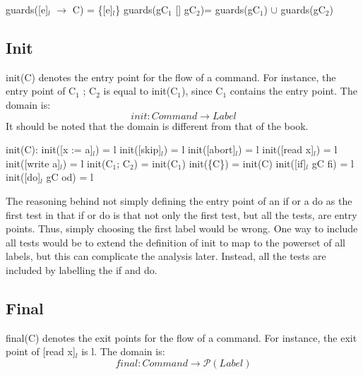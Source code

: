 guards([e]$_l$ $\to$ C)      = \{[e]$_l$\} \newline
guards(gC$_1$ [] gC$_2$)= guards(gC$_1$) $\cup$ guards(gC$_2$)\newline

\subsection{Init}

init(C) denotes the entry point for the flow of a command.
For instance, the entry point of C$_1$ ; C$_2$ is equal to init(C$_1$),
since C$_1$ contains the entry point. The domain is:
\[init \colon Command \to Label\]
It should be noted that the domain is different from that of the book.

init(C):\newline
init([x := a]$_l$)      = l\newline
init([skip]$_l$)        = l\newline
init([abort]$_l$)       = l\newline
init([read x]$_l$)      = l\newline
init([write a]$_l$)     = l\newline
init(C$_1$; C$_2$)        = init(C$_1$)\newline
init(\{C\})             = init(C)\newline
init([if]$_l$ gC fi)        = l\newline
init([do]$_l$ gC od)        = l\newline

The reasoning behind not simply defining the entry point of an if or a do as the first
test in that if or do is that not only the first test, but all the tests, are entry points.
Thus, simply choosing the first label would be wrong. One way to include all tests would
be to extend the definition of init to map to the powerset of all labels, but this
can complicate the analysis later. Instead, all the tests are included by labelling
the if and do.



\subsection{Final}

final(C) denotes the exit points for the flow of a command.
For instance, the exit point of [read x]$_l$ is l. The domain is:
\[final \colon Command \to \mathcal{P}(Label)\]

